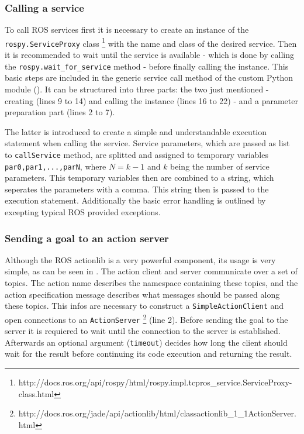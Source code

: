\begin{figure}[htbp]
	
\end{figure}

\subsubsection{Calling a service}
To call ROS services first it is necessary to create an instance of the \lstinline!rospy.ServiceProxy! class \footnote{http://docs.ros.org/api/rospy/html/rospy.impl.tcpros\_service.ServiceProxy-class.html} with the name and class of the desired service. Then it is recommended to wait until the service is available - which is done by calling the \lstinline!rospy.wait_for_service! method - before finally calling the instance. This basic steps are included in the generic service call method of the custom Python module (). It can be structured into three parts: the two just mentioned - creating (lines 9 to 14) and calling the instance (lines 16 to 22) - and a parameter preparation part (lines 2 to 7).

The latter is introduced to create a simple and understandable execution statement when calling the service. Service parameters, which are passed as list to \lstinline!callService! method, are splitted and assigned to temporary variables \lstinline!par0,par1,...,parN!, where $N=k-1$ and $k$ being the number of service parameters. This temporary variables then are combined to a string, which seperates the parameters with a comma. This string then is passed to the execution statement. Additionally the basic error handling is outlined by excepting typical ROS provided exceptions.

\begin{figure}[ht]
	
\end{figure}

\subsubsection{Sending a goal to an action server}
Although the ROS actionlib is a very powerful component, its usage is very simple, as can be seen in . The action client and server communicate over a set of topics. The action name describes the namespace containing these topics, and the action specification message describes what messages should be passed along these topics. This infos are necessary to construct a \lstinline!SimpleActionClient! and open connections to an \lstinline!ActionServer! \footnote{http://docs.ros.org/jade/api/actionlib/html/classactionlib\_1\_1ActionServer.html} (line 2). Before sending the goal to the server it is requiered to wait until the connection to the server is established. Afterwards an optional argument (\lstinline!timeout!) decides how long the client should wait for the result before continuing its code execution and returning the result.


